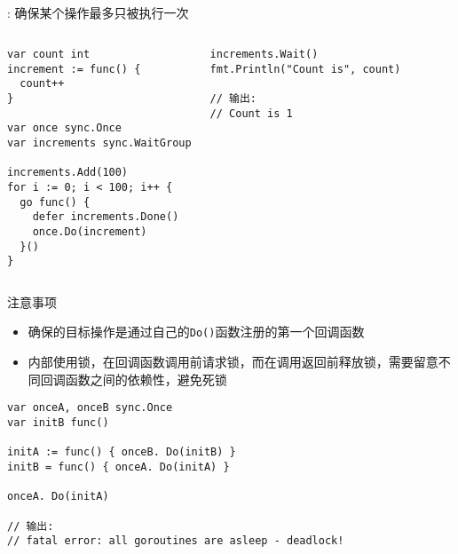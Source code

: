 \subsection{\Once }
\begin{frame}[fragile]{\Once }
  : 确保某个操作最多只被执行一次

\begin{columns}[T]
\begin{lstlisting}[caption={\Once 使用样例},xleftmargin=8pt]
var count int
increment := func() {
  count++
}

var once sync.Once
var increments sync.WaitGroup

increments.Add(100)
for i := 0; i < 100; i++ {
  go func() {
    defer increments.Done()
    once.Do(increment)
  }()
}
\end{lstlisting}

\begin{lstlisting}[caption={\Once 使用样例},firstnumber=last,xleftmargin=8pt]
increments.Wait()
fmt.Println("Count is", count)

// 输出:
// Count is 1    
\end{lstlisting}
\end{columns}
\end{frame}

\begin{frame}[fragile]{注意事项}
  \begin{itemize}
      \item \Once 确保的目标操作是通过自己的\texttt{Do()}函数注册的\alert{第一个}回调函数
      \item \Once 内部使用锁，在回调函数调用前请求锁，而在调用返回前释放锁，需要留意不同回调函数之间的依赖性，避免死锁
  \end{itemize}  

\begin{lstlisting}[caption={\Once 的使用不当导致死锁}]
var onceA, onceB sync.Once
var initB func()

initA := func() { onceB. Do(initB) }
initB = func() { onceA. Do(initA) }

onceA. Do(initA)    

// 输出:
// fatal error: all goroutines are asleep - deadlock!
\end{lstlisting}
\end{frame}